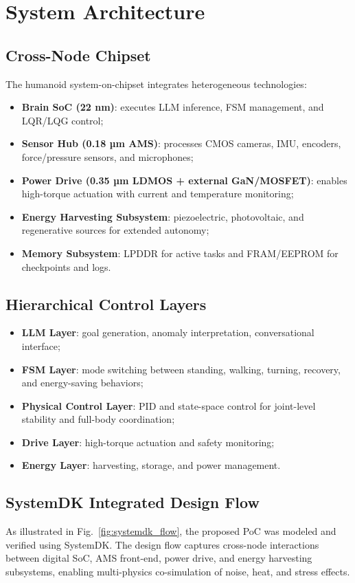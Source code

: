 \section{System Architecture}
\subsection{Cross-Node Chipset}
The humanoid system-on-chipset integrates heterogeneous technologies:
\begin{itemize}
  \item \textbf{Brain SoC (22 nm)}: executes LLM inference, FSM management, and LQR/LQG control;
  \item \textbf{Sensor Hub (0.18 µm AMS)}: processes CMOS cameras, IMU, encoders, force/pressure sensors, and microphones;
  \item \textbf{Power Drive (0.35 µm LDMOS + external GaN/MOSFET)}: enables high-torque actuation with current and temperature monitoring;
  \item \textbf{Energy Harvesting Subsystem}: piezoelectric, photovoltaic, and regenerative sources for extended autonomy;
  \item \textbf{Memory Subsystem}: LPDDR for active tasks and FRAM/EEPROM for checkpoints and logs.
\end{itemize}

\subsection{Hierarchical Control Layers}
\begin{itemize}
  \item \textbf{LLM Layer}: goal generation, anomaly interpretation, conversational interface;
  \item \textbf{FSM Layer}: mode switching between standing, walking, turning, recovery, and energy-saving behaviors;
  \item \textbf{Physical Control Layer}: PID and state-space control for joint-level stability and full-body coordination;
  \item \textbf{Drive Layer}: high-torque actuation and safety monitoring;
  \item \textbf{Energy Layer}: harvesting, storage, and power management.
\end{itemize}

\subsection{SystemDK Integrated Design Flow}
As illustrated in Fig.~\ref{fig:systemdk_flow}, the proposed PoC was modeled 
and verified using SystemDK. The design flow captures cross-node interactions 
between digital SoC, AMS front-end, power drive, and energy harvesting subsystems, 
enabling multi-physics co-simulation of noise, heat, and stress effects.

